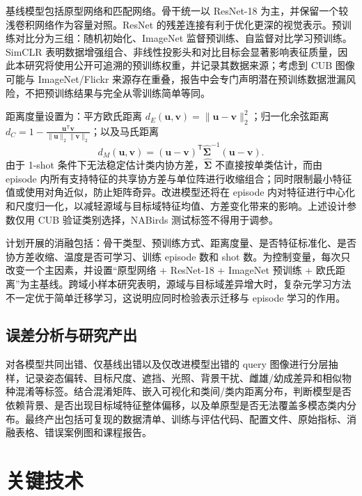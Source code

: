 \documentclass[UTF8,zihao=-4,scheme=chinese]{ctexart}
\begin{document}
基线模型包括原型网络和匹配网络。骨干统一以 ResNet-18 为主，并保留一个较浅卷积网络作为容量对照。ResNet 的残差连接有利于优化更深的视觉表示\cite{he2016resnet}。预训练对比分为三组：随机初始化、ImageNet 监督预训练、自监督对比学习预训练。SimCLR 表明数据增强组合、非线性投影头和对比目标会显著影响表征质量\cite{chen2020simclr}，因此本研究将使用公开可追溯的预训练权重，并记录其数据来源；考虑到 CUB 图像可能与 ImageNet/Flickr 来源存在重叠，报告中会专门声明潜在预训练数据泄漏风险，不把预训练结果与完全从零训练简单等同。

距离度量设置为：平方欧氏距离 $d_E(\bm{u},\bm{v})=\|\bm{u}-\bm{v}\|_2^2$；归一化余弦距离 $d_C=1-\frac{\bm{u}^{\mathsf T}\bm{v}}{\|\bm{u}\|_2\|\bm{v}\|_2}$；以及马氏距离
\begin{equation}
  d_M(\bm{u},\bm{v})=(\bm{u}-\bm{v})^{\mathsf T}
  \widehat{\bm{\Sigma}}^{-1}(\bm{u}-\bm{v}).
\end{equation}
由于 1-shot 条件下无法稳定估计类内协方差，$\widehat{\bm{\Sigma}}$ 不直接按单类估计，而由 episode 内所有支持特征的共享协方差与单位阵进行收缩组合；同时限制最小特征值或使用对角近似，防止矩阵奇异。改进模型还将在 episode 内对特征进行中心化和尺度归一化，以减轻源域与目标域特征均值、方差变化带来的影响。上述设计参数仅用 CUB 验证类别选择，NABirds 测试标签不得用于调参。

计划开展的消融包括：骨干类型、预训练方式、距离度量、是否特征标准化、是否协方差收缩、温度是否可学习、训练 episode 数和 shot 数。为控制变量，每次只改变一个主因素，并设置“原型网络 + ResNet-18 + ImageNet 预训练 + 欧氏距离”为主基线。跨域小样本研究表明，源域与目标域差异增大时，复杂元学习方法不一定优于简单迁移学习，这说明应同时检验表示迁移与 episode 学习的作用\cite{guo2020broader}。

\subsection{误差分析与研究产出}

对各模型共同出错、仅基线出错以及仅改进模型出错的 query 图像进行分层抽样，记录姿态偏转、目标尺度、遮挡、光照、背景干扰、雌雄/幼成差异和相似物种混淆等标签。结合混淆矩阵、嵌入可视化和类间/类内距离分布，判断模型是否依赖背景、是否出现目标域特征整体偏移，以及单原型是否无法覆盖多模态类内分布。最终产出包括可复现的数据清单、训练与评估代码、配置文件、原始指标、消融表格、错误案例图和课程报告。

\section{关键技术}
\end{document}
